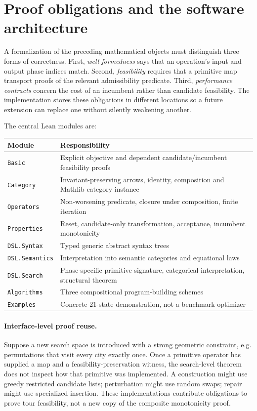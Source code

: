 \documentclass[11pt,a4paper]{article}
\begin{document}
\appendix
\section{Proof obligations and the software architecture}

A formalization of the preceding mathematical objects must distinguish
three forms of correctness. First, \emph{well-formedness} says that an
operation's input and output phase indices match. Second, \emph{feasibility}
requires that a primitive map transport proofs of the relevant admissibility
predicate. Third, \emph{performance contracts} concern the cost of an
incumbent rather than candidate feasibility. The implementation stores these
obligations in different locations so a future extension can replace one
without silently weakening another.

The central Lean modules are:
\begin{center}
\small
\begin{tabular}{p{3.2cm}p{9.0cm}}
\toprule
Module & Responsibility \\
\midrule
\texttt{Basic} & Explicit objective and dependent candidate/incumbent feasibility proofs \\
\texttt{Category} & Invariant-preserving arrows, identity, composition and Mathlib category instance \\
\texttt{Operators} & Non-worsening predicate, closure under composition, finite iteration \\
\texttt{Properties} & Reset, candidate-only transformation, acceptance, incumbent monotonicity \\
\texttt{DSL.Syntax} & Typed generic abstract syntax trees \\
\texttt{DSL.Semantics} & Interpretation into semantic categories and equational laws \\
\texttt{DSL.Search} & Phase-specific primitive signature, categorical interpretation, structural theorem \\
\texttt{Algorithms} & Three compositional program-building schemes \\
\texttt{Examples} & Concrete 21-state demonstration, not a benchmark optimizer \\
\bottomrule
\end{tabular}
\end{center}

\paragraph{Interface-level proof reuse.}
Suppose a new search space is introduced with a strong geometric constraint,
e.g. permutations that visit every city exactly once. Once a primitive
operator has supplied a map and a feasibility-preservation witness, the
search-level theorem does not inspect how that primitive was implemented.
A construction might use greedy restricted candidate lists; perturbation
might use random swaps; repair might use specialized insertion. These
implementations contribute obligations to prove tour feasibility, not a
new copy of the composite monotonicity proof.
\end{document}
